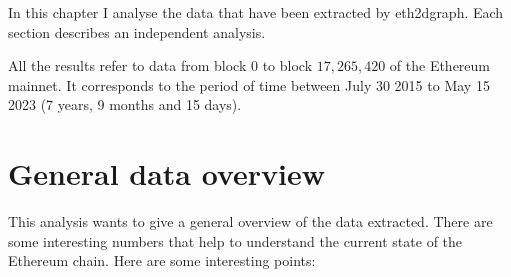 \label{chapter-6}

In this chapter I analyse the data that have been extracted by eth2dgraph. Each section describes an independent analysis.

All the results refer to data from block $0$ to block $17,265,420$ of the Ethereum mainnet. It corresponds to the period of time between July 30 2015 to May 15 2023 (7 years, 9 months and 15 days).

\section{General data overview}

This analysis wants to give a general overview of the data extracted. There are some interesting numbers that help to understand the current state of the Ethereum chain. Here are some interesting points:

